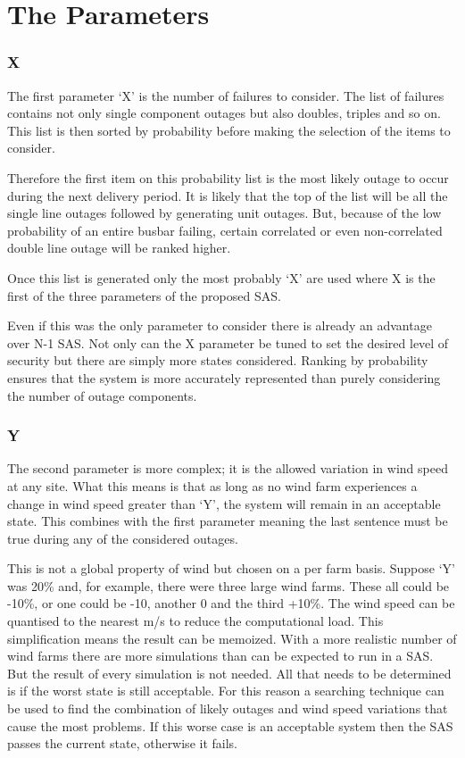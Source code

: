 \documentclass[a4paper,oneside,12pt]{report}
\begin{document}
\section{The Parameters}

\subsubsection{X}

The first parameter `X' is the number of failures to consider. The list of failures contains not only single component outages but also doubles, triples and so on. This list is then sorted by probability before making the selection of the items to consider.

Therefore the first item on this probability list is the most likely outage to occur during the next delivery period. It is likely that the top of the list will be all the single line outages followed by generating unit outages. But, because of the low probability of an entire busbar failing, certain correlated or even non-correlated double line outage will be ranked higher.

Once this list is generated only the most probably `X' are used where X is the first of the three parameters of the proposed SAS.

Even if this was the only parameter to consider there is already an advantage over N-1 SAS. Not only can the X parameter be tuned to set the desired level of security but there are simply more states considered. Ranking by probability ensures that the system is more accurately represented than purely considering the number of outage components.

\subsubsection{Y}

The second parameter is more complex; it is the allowed variation in wind speed at any site. What this means is that as long as no wind farm experiences a change in wind speed greater than `Y', the system will remain in an acceptable state. This combines with the first parameter meaning the last sentence must be true during any of the considered outages.

This is not a global property of wind but chosen on a per farm basis. Suppose `Y' was 20\% and, for example, there were three large wind farms. These all could be -10\%, or one could be -10, another 0 and the third +10\%. The wind speed can be quantised to the nearest m/s to reduce the computational load. This simplification means the result can be memoized. With a more realistic number of wind farms there are more simulations than can be expected to run in a SAS. But the result of every simulation is not needed. All that needs to be determined is if the worst state is still acceptable. For this reason a searching technique can be used to find the combination of likely outages and wind speed variations that cause the most problems. If this worse case is an acceptable system then the SAS passes the current state, otherwise it fails.
\end{document}
